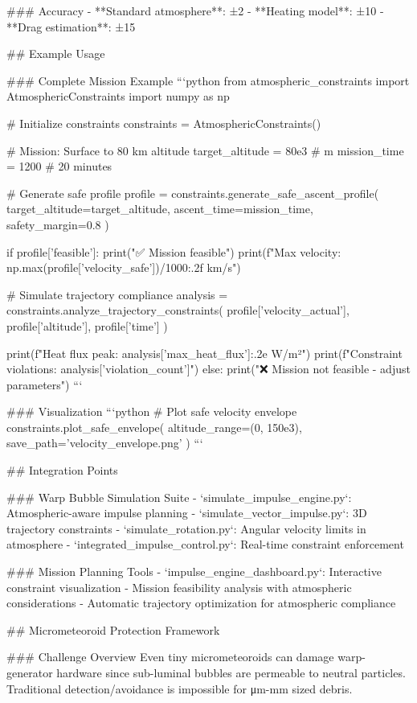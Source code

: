### Accuracy
- **Standard atmosphere**: ±2%
- **Heating model**: ±10%
- **Drag estimation**: ±15%

## Example Usage

### Complete Mission Example
```python
from atmospheric_constraints import AtmosphericConstraints
import numpy as np

# Initialize constraints
constraints = AtmosphericConstraints()

# Mission: Surface to 80 km altitude
target_altitude = 80e3  # m
mission_time = 1200     # 20 minutes

# Generate safe profile
profile = constraints.generate_safe_ascent_profile(
    target_altitude=target_altitude,
    ascent_time=mission_time,
    safety_margin=0.8
)

if profile['feasible']:
    print("✅ Mission feasible")
    print(f"Max velocity: {np.max(profile['velocity_safe'])/1000:.2f} km/s")
    
    # Simulate trajectory compliance
    analysis = constraints.analyze_trajectory_constraints(
        profile['velocity_actual'],
        profile['altitude'], 
        profile['time']
    )
    
    print(f"Heat flux peak: {analysis['max_heat_flux']:.2e} W/m²")
    print(f"Constraint violations: {analysis['violation_count']}")
else:
    print("❌ Mission not feasible - adjust parameters")
```

### Visualization
```python
# Plot safe velocity envelope
constraints.plot_safe_envelope(
    altitude_range=(0, 150e3),
    save_path='velocity_envelope.png'
)
```

## Integration Points

### Warp Bubble Simulation Suite
- `simulate_impulse_engine.py`: Atmospheric-aware impulse planning
- `simulate_vector_impulse.py`: 3D trajectory constraints
- `simulate_rotation.py`: Angular velocity limits in atmosphere
- `integrated_impulse_control.py`: Real-time constraint enforcement

### Mission Planning Tools
- `impulse_engine_dashboard.py`: Interactive constraint visualization
- Mission feasibility analysis with atmospheric considerations
- Automatic trajectory optimization for atmospheric compliance

## Micrometeoroid Protection Framework

### Challenge Overview
Even tiny micrometeoroids can damage warp-generator hardware since sub-luminal bubbles are permeable to neutral particles. Traditional detection/avoidance is impossible for μm-mm sized debris.

